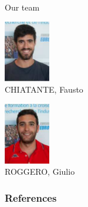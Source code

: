\documentclass{beamer}
\begin{document}
\begin{frame}{Our team}
\begin{minipage}[l][\dimexpr 0.45\textheight-2\fboxsep-2\fboxrule\relax][t]{\dimexpr .495\textwidth-2\fboxsep-2\fboxrule\relax}
      \begin{center}
        \includegraphics[height=2.7cm]{./graphics/chiatante}\\
        CHIATANTE, Fausto
      \end{center}
  \end{minipage}%
  \hfill
  \begin{minipage}[r][\dimexpr 0.45\textheight-2\fboxsep-2\fboxrule\relax][t]{\dimexpr .495\textwidth-2\fboxsep-2\fboxrule\relax}%
    \begin{center}
      \includegraphics[height=2.7cm]{./graphics/roggero}\\
      ROGGERO, Giulio
    \end{center}
  \end{minipage}%
\end{frame}

\begin{frame}[allowframebreaks]
	\frametitle{References}
	\footnotesize
	
	
\end{frame}
\end{document}
